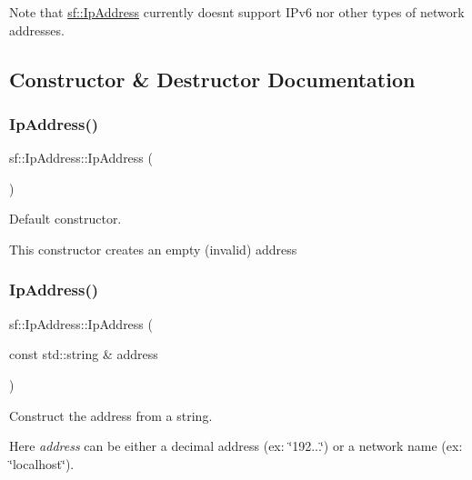 Note that \mbox{\hyperlink{classsf_1_1_ip_address}{sf\+::\+Ip\+Address}} currently doesn\textquotesingle{}t support I\+Pv6 nor other types of network addresses. \begin{DoxyVerb}\end{DoxyVerb}
 

\subsection{Constructor \& Destructor Documentation}
\mbox{\label{classsf_1_1_ip_address_af32a0574baa0f46e48deb2d83ca7658b}} 
\subsubsection{\texorpdfstring{IpAddress()}{IpAddress()}\hspace{0.1cm}{\footnotesize\ttfamily [1/5]}}
{\footnotesize\ttfamily sf\+::\+Ip\+Address\+::\+Ip\+Address (\begin{DoxyParamCaption}{ }\end{DoxyParamCaption})}



Default constructor. 

This constructor creates an empty (invalid) address \begin{DoxyVerb}\end{DoxyVerb}
 \mbox{\label{classsf_1_1_ip_address_a656b7445ab04cabaa7398685bc09c3f7}} 
\subsubsection{\texorpdfstring{IpAddress()}{IpAddress()}\hspace{0.1cm}{\footnotesize\ttfamily [2/5]}}
{\footnotesize\ttfamily sf\+::\+Ip\+Address\+::\+Ip\+Address (\begin{DoxyParamCaption}\item[{const std\+::string \&}]{address }\end{DoxyParamCaption})}



Construct the address from a string. 

Here {\itshape address} can be either a decimal address (ex\+: \char`\"{}192...\char`\"{}) or a network name (ex\+: \char`\"{}localhost\char`\"{}).


